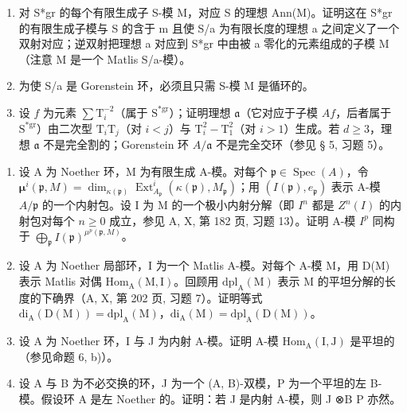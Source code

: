 \begin{enumerate}
\def\labelenumi{\alph{enumi})}
\item
  对 S*gr 的每个有限生成子 S-模 M，对应 S 的理想 Ann(M)。证明这在 S*gr 的有限生成子模与 S 的含于 m 且使 S/a 为有限长度的理想 a 之间定义了一个双射对应；逆双射把理想 a 对应到 S*gr 中由被 a 零化的元素组成的子模 M（注意 M 是一个 Matlis S/a-模）。
\item
  为使 S/a 是 Gorenstein 环，必须且只需 S-模 M 是循环的。
\item
  设 \(f\) 为元素 \(\sum \mathrm{T}_i^{-2}\)（属于 \(\mathrm{S}^{*\mathrm{gr}}\)）；证明理想 \(\mathfrak{a}\)（它对应于子模 \(A f\)，后者属于 \(\mathrm{S}^{*\mathrm{gr}}\)）由二次型 \(\mathrm{T}_i\mathrm{T}_j\)（对 \(i < j\)）与 \(\mathrm{T}_i^2 - \mathrm{T}_1^2\)（对 \(i > 1\)）生成。若 \(d \geqslant 3\)，理想 \(\mathfrak{a}\) 不是完全割的；Gorenstein 环 \(A / \mathfrak{a}\) 不是完全交环（参见 § 5, 习题 5）。
\end{enumerate}

\begin{enumerate}
\def\labelenumi{\arabic{enumi})}
\setcounter{enumi}{3}
\item
  设 A 为 Noether 环，M 为有限生成 A-模。对每个 \(\mathfrak{p} \in \operatorname{Spec}(A)\)，令 \(\boldsymbol{\mu}^{i}(\mathfrak{p}, M) = \dim_{\kappa(\mathfrak{p})} \operatorname{Ext}_{A_{\mathfrak{p}}}^{i}(\kappa(\mathfrak{p}), M_{\mathfrak{p}})\)；用 \((I(\mathfrak{p}), e_{\mathfrak{p}})\) 表示 A-模 \(A/\mathfrak{p}\) 的一个内射包。设 I 为 M 的一个极小内射分解（即 \(I^{n}\) 都是 \(Z^{n}(I)\) 的内射包对每个 \(n \geqslant 0\) 成立，参见 A, X, 第 182 页, 习题 13）。证明 A-模 \(I^{p}\) 同构于 \(\bigoplus_{\mathfrak{p}} I(\mathfrak{p})^{\mu^{p}(\mathfrak{p}, M)}\)。
\item
  设 A 为 Noether 局部环，I 为一个 Matlis A-模。对每个 A-模 M，用 D(M) 表示 Matlis 对偶 \(\mathrm{Hom}_{\mathrm{A}}(\mathrm{M},\mathrm{I})\)。回顾用 \(\mathrm{dpl}_{\mathrm{A}}(\mathrm{M})\) 表示 M 的平坦分解的长度的下确界（A, X, 第 202 页, 习题 7）。证明等式 \(\mathrm{di}_{\mathrm{A}}(\mathrm{D}(\mathrm{M})) = \mathrm{dpl}_{\mathrm{A}}(\mathrm{M})\)，\(\mathrm{di}_{\mathrm{A}}(\mathrm{M}) = \mathrm{dpl}_{\mathrm{A}}(\mathrm{D}(\mathrm{M}))\)。
\item
  设 A 为 Noether 环，I 与 J 为内射 A-模。证明 A-模 \(\mathrm{Hom}_{\mathrm{A}}(\mathrm{I},\mathrm{J})\) 是平坦的（参见命题 6, b)）。
\item
  设 A 与 B 为不必交换的环，J 为一个 (A, B)-双模，P 为一个平坦的左 B-模。假设环 A 是左 Noether 的。证明：若 J 是内射 A-模，则 J ⊗B P 亦然。
\end{enumerate}

